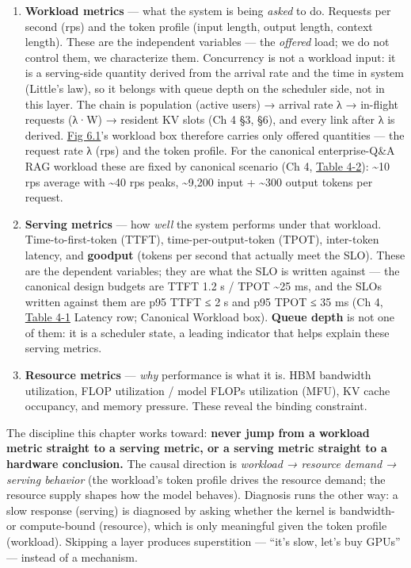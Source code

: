 \begin{enumerate}
\def\labelenumi{\arabic{enumi}.}
\item
  \textbf{Workload metrics} --- what the system is being \emph{asked} to
  do. Requests per second (rps) and the token profile (input length,
  output length, context length). These are the independent variables
  --- the \emph{offered} load; we do not control them, we characterize
  them. Concurrency is not a workload input: it is a serving-side
  quantity derived from the arrival rate and the time in system
  (Little's law), so it belongs with queue depth on the scheduler side,
  not in this layer. The chain is population (active users) → arrival
  rate λ → in-flight requests (λ·W) → resident KV slots (Ch 4 §3, §6),
  and every link after λ is derived. \hyperref[fig:6.1]{Fig 6.1}'s workload box therefore
  carries only offered quantities --- the request rate λ (rps) and the
  token profile. For the canonical enterprise-Q\&A RAG workload these
  are fixed by canonical scenario (Ch 4, \hyperref[tab:4.2]{Table 4-2}): \textasciitilde10
  rps average with \textasciitilde40 rps peaks, \textasciitilde9,200
  input + \textasciitilde300 output tokens per request.
\item
  \textbf{Serving metrics} --- how \emph{well} the system performs under
  that workload. Time-to-first-token (TTFT), time-per-output-token
  (TPOT), inter-token latency, and \textbf{goodput} (tokens per second
  that actually meet the SLO). These are the dependent variables; they
  are what the SLO is written against --- the canonical design budgets
  are TTFT 1.2 s / TPOT \textasciitilde25 ms, and the SLOs written
  against them are p95 TTFT ≤ 2 s and p95 TPOT ≤ 35 ms (Ch 4, \hyperref[tab:4.1]{Table 4-1}
  Latency row; Canonical Workload box). \textbf{Queue depth} is not one
  of them: it is a scheduler state, a leading indicator that helps
  explain these serving metrics.
\item
  \textbf{Resource metrics} --- \emph{why} performance is what it is.
  HBM bandwidth utilization, FLOP utilization / model FLOPs utilization
  (MFU), KV cache occupancy, and memory pressure. These reveal the
  binding constraint.
\end{enumerate}

The discipline this chapter works toward: \textbf{never jump from a
workload metric straight to a serving metric, or a serving metric
straight to a hardware conclusion.} The causal direction is
\emph{workload → resource demand → serving behavior} (the workload's
token profile drives the resource demand; the resource supply shapes how
the model behaves). Diagnosis runs the other way: a slow response
(serving) is diagnosed by asking whether the kernel is bandwidth- or
compute-bound (resource), which is only meaningful given the token
profile (workload). Skipping a layer produces superstition --- ``it's
slow, let's buy GPUs'' --- instead of a mechanism.


